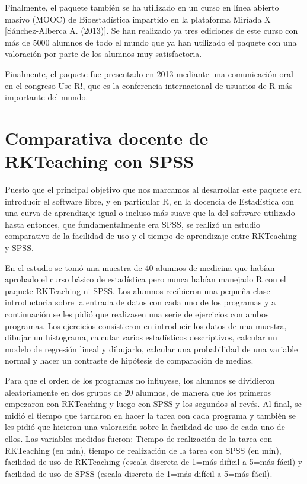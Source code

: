 \documentclass[10pt,twoside,spanish]{article}
\numberwithin{equation}{section}
\begin{document}
Finalmente, el paquete también se ha utilizado en un curso en línea abierto masivo (MOOC) de Bioestadística impartido en
la plataforma Miríada X [Sánchez-Alberca A. (2013)]. Se han realizado ya tres ediciones de este curso con más de 5000
alumnos de todo el mundo que ya han utilizado el paquete con una valoración por parte de los alumnos muy satisfactoria.

Finalmente, el paquete fue presentado en 2013 mediante una comunicación oral en el congreso Use R!, que es la
conferencia internacional de usuarios de R más importante del mundo. 
  

\section{Comparativa docente de RKTeaching con SPSS}
Puesto que el principal objetivo que nos marcamos al desarrollar este paquete era introducir el software libre, y en particular R, en la
docencia de Estadística con una curva de aprendizaje igual o incluso más suave que la del software utilizado hasta entonces, que
fundamentalmente era SPSS, se realizó un estudio comparativo de la facilidad de uso y el tiempo de aprendizaje entre RKTeaching y SPSS.

En el estudio se tomó una muestra de 40 alumnos de medicina que habían aprobado el curso básico de estadística pero nunca habían manejado R
con el paquete RKTeaching ni SPSS. 
Los alumnos recibieron una pequeña clase introductoria sobre la entrada de datos con cada uno de los
programas y a continuación se les pidió que realizasen una serie de ejercicios con ambos programas.
Los ejercicios consistieron en introducir los datos de una muestra, dibujar un histograma, calcular varios estadísticos descriptivos,
calcular un modelo de regresión lineal y dibujarlo, calcular una probabilidad de una variable normal y hacer un contraste de hipótesis de
comparación de medias.

Para que el orden de los programas no influyese, los alumnos se dividieron aleatoriamente en dos grupos de 20 alumnos,
de manera que los primeros empezaron con RKTeaching y luego con SPSS y los segundos al revés.
Al final, se midió el tiempo que tardaron en hacer la tarea con cada programa y también se les pidió que hicieran una
valoración sobre la facilidad de uso de cada uno de ellos.
Las variables medidas fueron: Tiempo de realización de la tarea con RKTeaching (en min), tiempo de realización de la
tarea con SPSS (en min), facilidad de uso de RKTeaching (escala discreta de 1=más difícil a 5=más fácil) y facilidad de
uso de SPSS (escala discreta de 1=más difícil a 5=más fácil).
\end{document}
